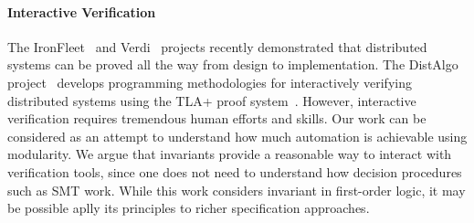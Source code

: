 \paragraph{Interactive Verification}
The IronFleet~\cite{IronFleet} and Verdi~\cite{Verdi} projects recently demonstrated
that distributed systems can be proved all the way from design to implementation.
%
The DistAlgo project~\cite{DistAlgo,chand_formal_2016} develops programming methodologies for interactively verifying distributed systems using the TLA+ proof system~\cite{chaudhuri_tla+proof_2010}.
However, interactive verification requires tremendous human efforts and skills.
Our work can be considered as an attempt to understand how much automation is achievable using modularity.
We argue that invariants provide a reasonable way to interact with verification tools, since one does not need
to understand how decision procedures such as SMT work.
While this work considers invariant in first-order logic, it may be possible aplly its principles to richer specification approaches.

